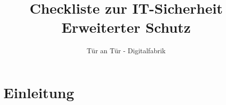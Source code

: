 \documentclass[10pt,a4paper]{article}
\begin{document}
\title{%
  Checkliste zur IT-Sicherheit \\
  \large Erweiterter Schutz}
\author{Tür an Tür - Digitalfabrik}
\maketitle

\section{Einleitung}
\end{document}
